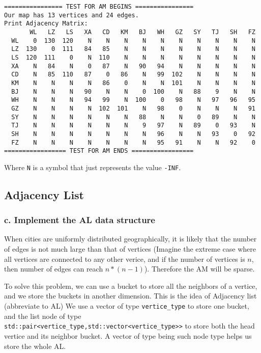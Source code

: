 \begin{verbatim}
================ TEST FOR AM BEGINS ================
Our map has 13 vertices and 24 edges.
Print Adjacency Matrix:
       WL   LZ   LS   XA   CD   KM   BJ   WH   GZ   SY   TJ   SH   FZ
  WL    0  130  120    N    N    N    N    N    N    N    N    N    N
  LZ  130    0  111   84   85    N    N    N    N    N    N    N    N
  LS  120  111    0    N  110    N    N    N    N    N    N    N    N
  XA    N   84    N    0   87    N   90   94    N    N    N    N    N
  CD    N   85  110   87    0   86    N   99  102    N    N    N    N
  KM    N    N    N    N   86    0    N    N  101    N    N    N    N
  BJ    N    N    N   90    N    N    0  100    N   88    9    N    N
  WH    N    N    N   94   99    N  100    0   98    N   97   96   95
  GZ    N    N    N    N  102  101    N   98    0    N    N    N   91
  SY    N    N    N    N    N    N   88    N    N    0   89    N    N
  TJ    N    N    N    N    N    N    9   97    N   89    0   93    N
  SH    N    N    N    N    N    N    N   96    N    N   93    0   92
  FZ    N    N    N    N    N    N    N   95   91    N    N   92    0
================= TEST FOR AM ENDS =================
\end{verbatim}

Where \verb|N| is a symbol that just represents the value \verb|-INF|.

\subsection{Adjacency List}
\subsubsection*{c. Implement the \textbf{AL} data structure}
When cities are uniformly distributed geographically, it is likely that the number of edges is not much large than that of vertices (Imagine the extreme case where all vertices are connected to any other verice, and if the number of vertices is $n$, then number of edges can reach $n*(n-1)$). Therefore the AM will be sparse. 

To solve this problem, we can use a bucket to store all the neighbors of a vertice, and we store the buckets in another dimension. This is the idea of Adjacency list (abbreviate to AL) We use a vector of type \verb|vertice_type| to store one bucket, and the list node of type \verb|std::pair<vertice_type,|\newline \verb|std::vector<vertice_type>>| to store both the head vertice and its neighbor bucket. A vector of type being such node type helps us store the whole AL. 

